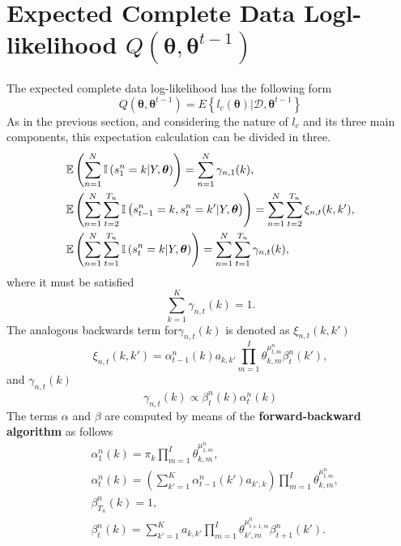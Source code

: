 \documentclass[12pt]{article}
\newcommand{\indicator}{\mathbb{I}}
\newcommand{\bs}{\boldsymbol}
\begin{document}
\section{Expected Complete Data Logl-likelihood $Q \left( \boldsymbol { \theta } , \boldsymbol { \theta } ^ { t - 1 } \right)$}
The expected complete data log-likelihood has the following form
\begin{equation}
Q \left( \boldsymbol { \theta } , \boldsymbol { \theta } ^ { t - 1 } \right) = E \left\{ l _ { c } ( \boldsymbol { \theta } ) | \mathcal { D } , \boldsymbol { \theta } ^ { t - 1 } \right\}
\end{equation}
As in the previous section, and considering the nature of $l_{c}$ and its three main components, this expectation calculation can be divided in three.
\begin{align}
& \expectation \left( \sum _ { n = 1 } ^ { N } \indicator \left( s _ { 1 } ^ { n } = k | Y , \bs\theta \right) \right) = \sum _ { n = 1 } ^ { N } \gamma _ { n , 1 } ( k ), \\
& \expectation \left( \sum _ { n = 1 } ^ { N } \sum _ { t = 2 } ^ { T _ { n } } \indicator \left( s _ { t - 1 } ^ { n } = k , s _ { t } ^ { n } = k' | Y , \bs\theta \right) \right) = \sum _ { n = 1 } ^ { N } \sum _ { t = 2 } ^ { T _ { n } } \xi _ { n , t } ( k , k' ), \\
& \expectation \left( \sum _ { n = 1 } ^ { N } \sum _ { t = 1 } ^ { T _ { n } } \indicator \left( s _ { t } ^ { n } = k | Y , \bs\theta \right) \right) = \sum _ { n = 1 } ^ { N } \sum _ { t = 1 } ^ { T _ { n } } \gamma _ { n , t } ( k ),
\end{align}
where it must be satisfied
\begin{equation}
\sum _ { k = 1 } ^ { K } \gamma _ { n , t } ( k ) = 1.
\end{equation}
\noindent The analogous backwards term for$ \gamma _ { n , t } ( k ) $ is denoted as $\xi _ { n,t } ( k , k' )$ 
\begin{equation}
\xi _ { n,t } ( k , k' ) = \alpha _ { t-1 }^{n} ( k ) a _ { k,k' } \prod\limits_{m=1}^{I} \theta_{k,m}^{\mu^{n}_{t,m}} \beta _ { t }^{n} ( k' ),
\end{equation}
and $ \gamma _ { n , t } ( k ) $
\begin{equation}\label{eq:gamma}
\gamma _ { n , t } ( k )\propto \beta _ { t }^{n} ( k )\alpha _ { t }^{n} ( k )
\end{equation}
The terms $\alpha$ and $\beta$ are computed by means of the \textbf{forward-backward algorithm }as follows
\begin{align}
\label{alfabeta}
&\alpha _ { 1 }^{n} ( k ) = \pi _ { k } \prod\limits_{m=1}^{I}\theta_{k,m}^{\mu^{n}_{1,m}}, \\
&\alpha _ { t }^{n} ( k ) = \left( \sum _ { k' = 1 } ^ { K } \alpha _ { t - 1 }^{n} ( k' ) a _ { k',k } \right) \prod\limits_{m=1}^{I}\theta_{k,m}^{\mu^{n}_{t,m}}, \\
&\beta _ { T_{n} }^{n} ( k ) = 1, \\
& \beta _ { t }^{n} ( k ) = \sum _ {k' = 1 } ^ { K } a _ { k,k'}  \prod\limits_{m=1}^{I}\theta_{k',m}^{\mu^{n}_{t+1,m}}  \beta _ { t + 1 }^{n} ( k' ).
\end{align}
\end{document}
